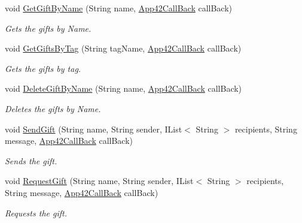 \begin{DoxyCompactItemize}
void \hyperlink{classcom_1_1shephertz_1_1app42_1_1paas_1_1sdk_1_1csharp_1_1gift_1_1_gift_service_a970c18c6107b4dd90a55418e39d3900d}{Get\+Gift\+By\+Name} (String name, \hyperlink{interfacecom_1_1shephertz_1_1app42_1_1paas_1_1sdk_1_1csharp_1_1_app42_call_back}{App42\+Call\+Back} call\+Back)
\begin{DoxyCompactList}\small\item\em Gets the gifts by Name. \end{DoxyCompactList}\item 
void \hyperlink{classcom_1_1shephertz_1_1app42_1_1paas_1_1sdk_1_1csharp_1_1gift_1_1_gift_service_a8d11faa03152ea3de3c268a17637232c}{Get\+Gifts\+By\+Tag} (String tag\+Name, \hyperlink{interfacecom_1_1shephertz_1_1app42_1_1paas_1_1sdk_1_1csharp_1_1_app42_call_back}{App42\+Call\+Back} call\+Back)
\begin{DoxyCompactList}\small\item\em Gets the gifts by tag. \end{DoxyCompactList}\item 
void \hyperlink{classcom_1_1shephertz_1_1app42_1_1paas_1_1sdk_1_1csharp_1_1gift_1_1_gift_service_af7ce74aa967add8c8044ad4751f5a5d8}{Delete\+Gift\+By\+Name} (String name, \hyperlink{interfacecom_1_1shephertz_1_1app42_1_1paas_1_1sdk_1_1csharp_1_1_app42_call_back}{App42\+Call\+Back} call\+Back)
\begin{DoxyCompactList}\small\item\em Deletes the gifts by Name. \end{DoxyCompactList}\item 
void \hyperlink{classcom_1_1shephertz_1_1app42_1_1paas_1_1sdk_1_1csharp_1_1gift_1_1_gift_service_a7bae91898e7c502ca8525da6ccdf3f2f}{Send\+Gift} (String name, String sender, I\+List$<$ String $>$ recipients, String message, \hyperlink{interfacecom_1_1shephertz_1_1app42_1_1paas_1_1sdk_1_1csharp_1_1_app42_call_back}{App42\+Call\+Back} call\+Back)
\begin{DoxyCompactList}\small\item\em Sends the gift. \end{DoxyCompactList}\item 
void \hyperlink{classcom_1_1shephertz_1_1app42_1_1paas_1_1sdk_1_1csharp_1_1gift_1_1_gift_service_abb070abdabbacac66bfbb7394e21e6e0}{Request\+Gift} (String name, String sender, I\+List$<$ String $>$ recipients, String message, \hyperlink{interfacecom_1_1shephertz_1_1app42_1_1paas_1_1sdk_1_1csharp_1_1_app42_call_back}{App42\+Call\+Back} call\+Back)
\begin{DoxyCompactList}\small\item\em Requests the gift. \end{DoxyCompactList}\item 

\end{DoxyCompactItemize}

